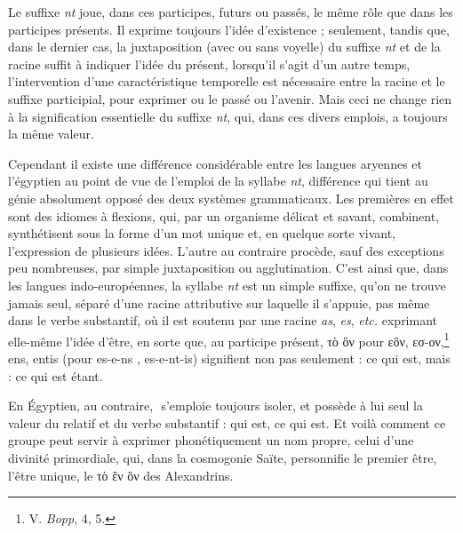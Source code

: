 \documentclass[a4paper, 11pt, oneside]{article}
\newcommand*\hieroAAAQ{}
\begin{document}
Le suffixe \emph{nt} joue, dans ces participes, futurs ou passés, le même rôle que dans les participes présents. Il exprime toujours l'idée d'existence ; seulement, tandis que, dans le dernier cas, la juxtaposition (avec ou sans voyelle) du suffixe \emph{nt} et de la racine suffit à indiquer l'idée du présent, lorsqu'il s'agit d'un autre temps, l'intervention d'une caractéristique temporelle est nécessaire entre la racine et le suffixe participial, pour exprimer ou le passé ou l'avenir. Mais ceci ne change rien à la signification essentielle du suffixe \emph{nt}, qui, dans ces divers emplois, a toujours la même valeur.

Cependant il existe une différence considérable entre les langues aryennes et l'égyptien au point de vue de l'emploi de la syllabe \emph{nt}, différence qui tient au génie absolument opposé des deux systèmes grammaticaux. Les premières en effet sont des idiomes à flexions, qui, par un organisme délicat et savant, combinent, synthétisent sous la forme d'un mot unique et, en quelque sorte vivant, l'expression de plusieurs idées. L'autre au contraire procède, sauf des exceptions peu nombreuses, par simple juxtaposition ou agglutination. C'est ainsi que, dans les langues indo-européennes, la syllabe \emph{nt} est un simple suffixe, qu'on ne trouve jamais seul, séparé d'une racine attributive sur laquelle il s'appuie, pas même dans le verbe substantif, où il est soutenu par une racine \emph{as}, \emph{es}, \emph{etc.} exprimant elle-même l'idée d'être, en sorte que, au participe présent, τὸ ὃν pour εὃν, εσ-ον,\footnote{V. \emph{Bopp}, 4, 5.} ens, entis (pour es-e-ns , es-e-nt-is) signifient non pas seulement : ce qui est, mais : ce qui est étant.

En Égyptien, au contraire, $\hieroAAAQ$ s'emploie toujours isoler, et possède à lui seul la valeur du relatif et du verbe substantif : qui est, ce qui est. Et voilà comment ce groupe peut servir à exprimer phonétiquement un nom propre, celui d'une divinité primordiale, qui, dans la cosmogonie Saïte, personnifie le premier être, l'être unique, le τὸ ἕν ὃν des Alexandrins.
\end{document}
